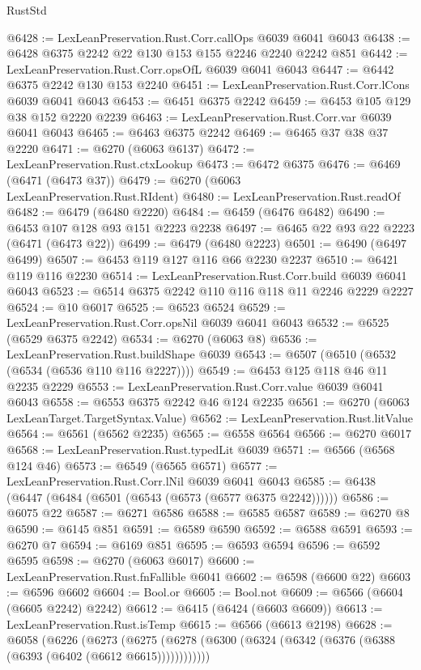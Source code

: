 \begin{lexlean}{RustStd}
\begin{coremodule}
@6428 := LexLeanPreservation.Rust.Corr.callOps @6039 @6041 @6043
@6438 := @6428 @6375 @2242 @22 @130 @153 @155 @2246 @2240 @2242 @851
@6442 := LexLeanPreservation.Rust.Corr.opsOfL @6039 @6041 @6043
@6447 := @6442 @6375 @2242 @130 @153 @2240
@6451 := LexLeanPreservation.Rust.Corr.lCons @6039 @6041 @6043
@6453 := @6451 @6375 @2242
@6459 := @6453 @105 @129 @38 @152 @2220 @2239
@6463 := LexLeanPreservation.Rust.Corr.var @6039 @6041 @6043
@6465 := @6463 @6375 @2242
@6469 := @6465 @37 @38 @37 @2220
@6471 := @6270 (@6063 @6137)
@6472 := LexLeanPreservation.Rust.ctxLookup
@6473 := @6472 @6375
@6476 := @6469 (@6471 (@6473 @37))
@6479 := @6270 (@6063 LexLeanPreservation.Rust.RIdent)
@6480 := LexLeanPreservation.Rust.readOf
@6482 := @6479 (@6480 @2220)
@6484 := @6459 (@6476 @6482)
@6490 := @6453 @107 @128 @93 @151 @2223 @2238
@6497 := @6465 @22 @93 @22 @2223 (@6471 (@6473 @22))
@6499 := @6479 (@6480 @2223)
@6501 := @6490 (@6497 @6499)
@6507 := @6453 @119 @127 @116 @66 @2230 @2237
@6510 := @6421 @119 @116 @2230
@6514 := LexLeanPreservation.Rust.Corr.build @6039 @6041 @6043
@6523 := @6514 @6375 @2242 @110 @116 @118 @11 @2246 @2229 @2227
@6524 := @10 @6017
@6525 := @6523 @6524
@6529 := LexLeanPreservation.Rust.Corr.opsNil @6039 @6041 @6043
@6532 := @6525 (@6529 @6375 @2242)
@6534 := @6270 (@6063 @8)
@6536 := LexLeanPreservation.Rust.buildShape @6039
@6543 := @6507 (@6510 (@6532 (@6534 (@6536 @110 @116 @2227))))
@6549 := @6453 @125 @118 @46 @11 @2235 @2229
@6553 := LexLeanPreservation.Rust.Corr.value @6039 @6041 @6043
@6558 := @6553 @6375 @2242 @46 @124 @2235
@6561 := @6270 (@6063 LexLeanTarget.TargetSyntax.Value)
@6562 := LexLeanPreservation.Rust.litValue
@6564 := @6561 (@6562 @2235)
@6565 := @6558 @6564
@6566 := @6270 @6017
@6568 := LexLeanPreservation.Rust.typedLit @6039
@6571 := @6566 (@6568 @124 @46)
@6573 := @6549 (@6565 @6571)
@6577 := LexLeanPreservation.Rust.Corr.lNil @6039 @6041 @6043
@6585 := @6438 (@6447 (@6484 (@6501 (@6543 (@6573 (@6577 @6375 @2242))))))
@6586 := @6075 @22
@6587 := @6271 @6586
@6588 := @6585 @6587
@6589 := @6270 @8
@6590 := @6145 @851
@6591 := @6589 @6590
@6592 := @6588 @6591
@6593 := @6270 @7
@6594 := @6169 @851
@6595 := @6593 @6594
@6596 := @6592 @6595
@6598 := @6270 (@6063 @6017)
@6600 := LexLeanPreservation.Rust.fnFallible @6041
@6602 := @6598 (@6600 @22)
@6603 := @6596 @6602
@6604 := Bool.or
@6605 := Bool.not
@6609 := @6566 (@6604 (@6605 @2242) @2242)
@6612 := @6415 (@6424 (@6603 @6609))
@6613 := LexLeanPreservation.Rust.isTemp
@6615 := @6566 (@6613 @2198)
@6628 := @6058
    (@6226
      (@6273 (@6275 (@6278 (@6300 (@6324 (@6342 (@6376 (@6388 (@6393 (@6402 (@6612 @6615))))))))))))

\end{coremodule}
\end{lexlean}
